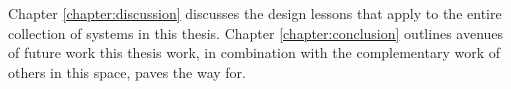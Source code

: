 Chapter \ref{chapter:discussion} discusses the design lessons that apply to the entire collection of systems in this thesis. Chapter \ref{chapter:conclusion} outlines avenues of future work this thesis work, in combination with the complementary work of others in this space, paves the way for.

